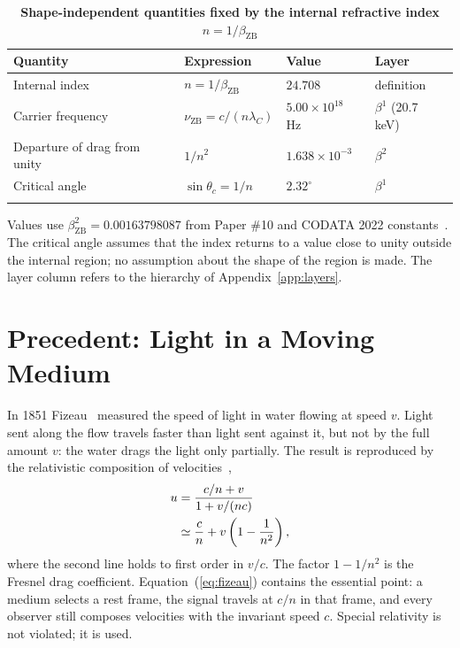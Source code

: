 \documentclass[%
 reprint, amsmath,amssymb, aps, prb, ]{revtex4-2}
\numberwithin{equation}{section}
\begin{document}
\begin{table}[t!]
\centering
\caption{\textbf{Shape-independent quantities fixed by the internal refractive index $n = 1/\beta_{\text{ZB}}$}}
\label{tab:layers}
\renewcommand{\arraystretch}{1.4}
\begin{tabular}{p{4.6cm}p{4.2cm}p{2.8cm}p{3.9cm}}
\toprule
\textbf{Quantity} & \textbf{Expression} & \textbf{Value} & \textbf{Layer} \\
\midrule
Internal index
& $n = 1/\beta_{\text{ZB}}$
& $24.708$
& definition \\
\addlinespace[0.3cm]
Carrier frequency
& $\nu_{\text{ZB}} = c/(n\lambda_C)$
& $5.00\times10^{18}$ Hz
& $\beta^1$ (20.7 keV) \\
\addlinespace[0.3cm]
Departure of drag from unity
& $1/n^2$
& $1.638\times10^{-3}$
& $\beta^2$ \\
\addlinespace[0.3cm]
Critical angle
& $\sin\theta_c = 1/n$
& $2.32^\circ$
& $\beta^1$ \\
\addlinespace[0.2cm]
\bottomrule
\end{tabular}
\vspace{0.2cm}
\begin{minipage}{0.95\textwidth}
\justifying\footnotesize
Values use $\beta_{\text{ZB}}^2 = 0.00163798087$ from Paper \#10 and CODATA 2022 constants~\cite{CODATA2022}. The critical angle assumes that the index returns to a value close to unity outside the internal region; no assumption about the shape of the region is made. The layer column refers to the hierarchy of Appendix~\ref{app:layers}.
\end{minipage}
\end{table}

\section{Precedent: Light in a Moving Medium}
\label{sec:fizeau}

In 1851 Fizeau~\cite{Fizeau1851} measured the speed of light in water flowing at speed $v$. Light sent along the flow travels faster than light sent against it, but not by the full amount $v$: the water drags the light only partially. The result is reproduced by the relativistic composition of velocities~\cite{Laue1907},
\begin{align}
u &= \frac{c/n + v}{1 + v/(nc)}
\notag\\
&\simeq \frac{c}{n} + v\left(1 - \frac{1}{n^2}\right),
\label{eq:fizeau}
\end{align}
where the second line holds to first order in $v/c$. The factor $1-1/n^2$ is the Fresnel drag coefficient. Equation~(\ref{eq:fizeau}) contains the essential point: a medium selects a rest frame, the signal travels at $c/n$ in that frame, and every observer still composes velocities with the invariant speed $c$. Special relativity is not violated; it is used.
\end{document}
